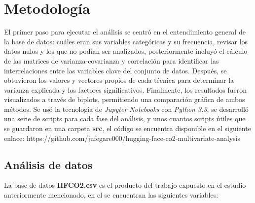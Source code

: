 \documentclass[journal]{IEEEtran}
\begin{document}
	
	\section{Metodología}
	\label{sec:methodology}
	El primer paso para ejecutar el análisis se centró en el entendimiento general de la base de datos: cuáles eran sus variables categóricas y su frecuencia, revisar los datos nulos y los que no podían ser analizados, posteriormente incluyó el cálculo de las matrices de varianza-covarianza y correlación para identificar las interrelaciones entre las variables clave del conjunto de datos. Después, se obtuvieron los valores y vectores propios de cada técnica para determinar la varianza explicada y los factores significativos. Finalmente, los resultados fueron visualizados a través de biplots, permitiendo una comparación gráfica de ambos métodos. Se usó la tecnología de \textit{Jupyter Notebooks} con \textit{Python 3.3}, se desarrolló una serie de scripts para cada fase del análisis, y unos cuantos scripts útiles que se guardaron en una carpeta \textbf{src}, el código se encuentra disponible en el siguiente enlace: 
	https://github.com/jufegare000/hugging-face-co2-multivariate-analysis
	
	\subsection{Análisis de datos}
	\label{ssec:pca}
	La base de datos \textbf{HFCO2.csv} es el producto del trabajo expuesto en el estudio anteriormente mencionado, en el se encuentran las siguientes variables: 
	
\end{document}
